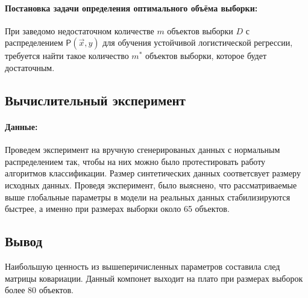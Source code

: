 \documentclass[12pt,twoside]{article}
\begin{document}
\paragraph{Постановка задачи определения оптимального объёма выборки:}
При заведомо недостаточном количестве $m$ объектов выборки $D$ с распределением $\mathsf{P}(\vec{x},y)$ для обучения устойчивой логистической регрессии, требуется найти такое количество $m^*$ объектов выборки, которое будет достаточным.
\subsection{Вычислительный эксперимент}
\paragraph{Данные:}
Проведем эксперимент на вручную сгенерированых данных с нормальным распределением так, чтобы на них можно было протестировать работу алгоритмов классификации.
Размер синтетических данных соответсвует размеру исходных данных. Проведя эксперимент, было выяснено, что рассматриваемые выше глобальные параметры в модели на реальных данных стабилизируются быстрее, а именно при размерах выборки около 65 объектов. 
\subsection{Вывод}
Наибольшую ценность из вышеперичисленных параметров составила след матрицы ковариации. Данный компонет выходит на плато при размерах выборок более 80 объектов.



\nocite{*}
\end{document}
